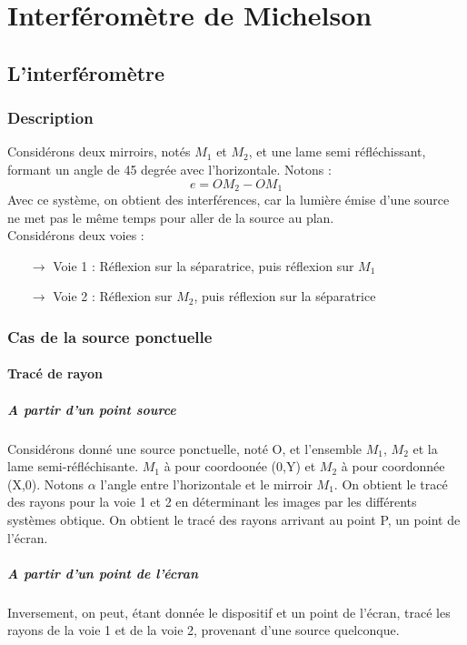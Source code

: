 \chapter{Interféromètre de Michelson}
\section{L'interféromètre}
\subsection{Description}
Considérons deux mirroirs, notés $M_1$ et $M_2$, et une lame semi réfléchissant, formant un angle de 45 degrée avec l'horizontale. Notons :
$$e = OM_2 - OM_1$$
Avec ce système, on obtient des interférences, car la lumière émise d'une source ne met pas le même temps pour aller de la source au plan.\\
Considérons deux voies : 
\begin{itemize}
 \item[$\rightarrow$] Voie 1 : Réflexion sur la séparatrice, puis réflexion sur $M_1$
 \item[$\rightarrow$] Voie 2 : Réflexion sur $M_2$, puis réflexion sur la séparatrice
\end{itemize}
\subsection{Cas de la source ponctuelle}
\subsubsection{Tracé de rayon}
\paragraph{A partir d'un point source}
Considérons donné une source ponctuelle, noté O, et l'ensemble $M_1$, $M_2$ et la lame semi-réfléchisante. $M_1$ à pour coordoonée (0,Y) et $M_2$ à pour coordonnée (X,0). Notons $\alpha$ l'angle entre l'horizontale et le mirroir $M_1$. On obtient le tracé des rayons pour la voie 1 et 2 en déterminant les images par les différents systèmes obtique. On obtient le tracé des rayons arrivant au point P, un point de l'écran.
\paragraph{A partir d'un point de l'écran}
Inversement, on peut, étant donnée le dispositif et un point de l'écran, tracé les rayons de la voie 1 et de la voie 2, provenant d'une source quelconque.
